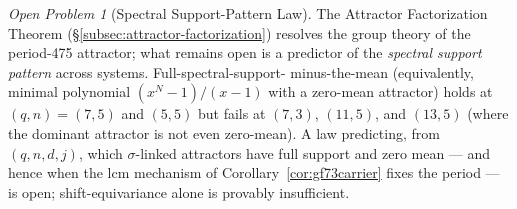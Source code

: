 \documentclass[11pt]{article}
\theoremstyle{remark}
\newtheorem{openprob}{Open Problem}
\begin{document}
\begin{openprob}[Spectral Support-Pattern Law]
\label{op:supportpattern}
The Attractor Factorization Theorem
(§\ref{subsec:attractor-factorization}) resolves the group theory of the
period-475 attractor; what remains open is a predictor of the
\emph{spectral support pattern} across systems. Full-spectral-support-%
minus-the-mean (equivalently, minimal polynomial $(x^{N}-1)/(x-1)$ with a
zero-mean attractor) holds at $(q,n) = (7,5)$ and $(5,5)$ but fails at
$(7,3)$, $(11,5)$, and $(13,5)$ (where the dominant attractor is not even
zero-mean). A law predicting, from $(q, n, d, j)$, which $\sigma$-linked
attractors have full support and zero mean --- and hence when the
$\mathrm{lcm}$ mechanism of Corollary~\ref{cor:gf73carrier} fixes the
period --- is open; shift-equivariance alone is provably insufficient.
\end{openprob}
\end{document}
